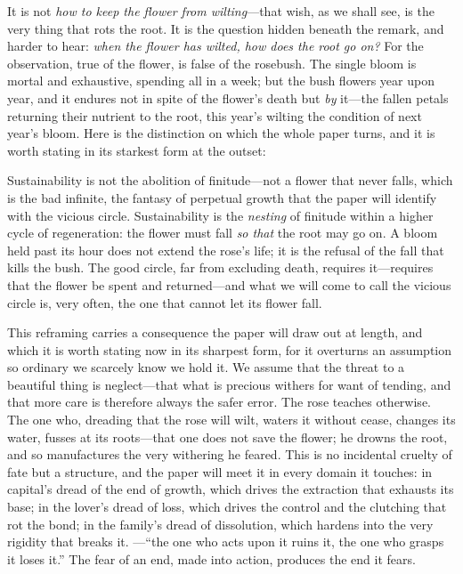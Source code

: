  It is not \emph{how to keep the flower from wilting}---that wish, as we shall see, is the very thing that rots the root. It is the question hidden beneath the remark, and harder to hear: \emph{when the flower has wilted, how does the root go on?} For the observation, true of the flower, is false of the rosebush. The single bloom is mortal and exhaustive, spending all in a week; but the bush flowers year upon year, and it endures not in spite of the flower's death but \emph{by} it---the fallen petals returning their nutrient to the root, this year's wilting the condition of next year's bloom. Here is the distinction on which the whole paper turns, and it is worth stating in its starkest form at the outset:

\begin{claim}
Sustainability is not the abolition of finitude---not a flower that never falls, which is the bad infinite, the fantasy of perpetual growth that the paper will identify with the vicious circle. Sustainability is the \emph{nesting} of finitude within a higher cycle of regeneration: the flower must fall \emph{so that} the root may go on. A bloom held past its hour does not extend the rose's life; it is the refusal of the fall that kills the bush. The good circle, far from excluding death, requires it---requires that the flower be spent and returned---and what we will come to call the vicious circle is, very often, the one that cannot let its flower fall.
\end{claim}

This reframing carries a consequence the paper will draw out at length, and which it is worth stating now in its sharpest form, for it overturns an assumption so ordinary we scarcely know we hold it. We assume that the threat to a beautiful thing is neglect---that what is precious withers for want of tending, and that more care is therefore always the safer error. The rose teaches otherwise.  The one who, dreading that the rose will wilt, waters it without cease, changes its water, fusses at its roots---that one does not save the flower; he drowns the root, and so manufactures the very withering he feared. This is no incidental cruelty of fate but a structure, and the paper will meet it in every domain it touches: in capital's dread of the end of growth, which drives the extraction that exhausts its base; in the lover's dread of loss, which drives the control and the clutching that rot the bond; in the family's dread of dissolution, which hardens into the very rigidity that breaks it. ---``the one who acts upon it ruins it, the one who grasps it loses it.'' The fear of an end, made into action, produces the end it fears.

